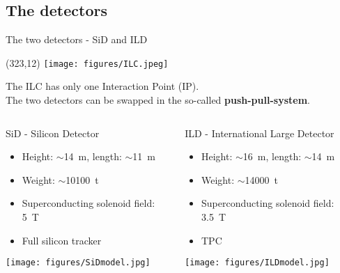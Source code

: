 \documentclass[xcolor={dvipsnames}]{beamer}
\newcommand{\ilclogo}{
  \setlength{\TPHorizModule}{1pt}
  \setlength{\TPVertModule}{1pt}
  \begin{textblock}{1}(323,12)
   \texttt{[image: figures/ILC.jpeg]}
  \end{textblock}
}
\begin{document}
\subsection{The detectors}
\begin{frame}{The two detectors - SiD and ILD}
\ilclogo
\begin{block}{}
The ILC has only one Interaction Point (IP).\\
The two detectors can be swapped in the so-called \textbf{push-pull-system}.
\end{block}

\begin{columns}
\begin{column}{0.48\textwidth}
\begin{center}
\alert{SiD - Silicon Detector}
\begin{itemize}
\item Height: $\sim$\SI{14}{\metre}, length:  $\sim$\SI{11}{\metre}
\item Weight: $\sim$\SI{10100}{\tonne}
\item Superconducting solenoid field: \SI{5}{\tesla}
\item Full silicon tracker
\end{itemize}

\texttt{[image: figures/SiDmodel.jpg]}

\end{center}
\end{column}

\begin{column}{0.48\textwidth}
\begin{center}
\alert{ILD - International Large Detector}
\begin{itemize}
\item Height: $\sim$\SI{16}{\metre}, length:  $\sim$\SI{14}{\metre}
\item Weight: $\sim$\SI{14000}{\tonne}
\item Superconducting solenoid field: \SI{3.5}{\tesla}
\item TPC
\end{itemize}

\texttt{[image: figures/ILDmodel.jpg]}

\end{center}
\end{column}
\end{columns}
\end{frame}
\end{document}
